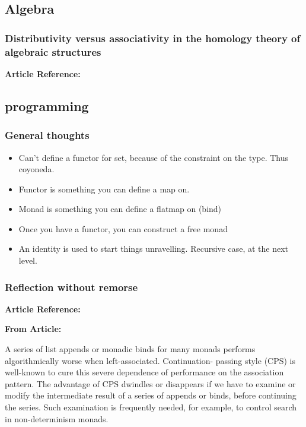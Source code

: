 \documentclass{article}
\begin{document}
\subsection{Algebra}

\subsubsection{Distributivity versus associativity in the homology theory of algebraic structures}

\textbf{Article Reference:} \cite{2011arXiv1109.4850P}

\subsection{programming}

\subsubsection{General thoughts}

\begin{itemize}
  \item Can't define a functor for set, because of the constraint on the type. Thus coyoneda. 
  \item Functor is something you can define a map on. 
  \item Monad is something you can define a flatmap on (bind)
  \item Once you have a functor, you can construct a free monad
  \item An identity is used to start things unravelling. Recursive case, at the next level. 
\end{itemize}

\subsubsection{Reflection without remorse}

\textbf{Article Reference:} \cite{conf/haskell/PloegKiselyov14}

\textbf{From Article:}

A series of list appends or monadic binds for many monads performs algorithmically worse when left-associated. Continuation- passing style (CPS) is well-known to cure this severe dependence of performance on the association pattern. The advantage of CPS dwindles or disappears if we have to examine or modify the intermediate result of a series of appends or binds, before continuing the series. Such examination is frequently needed, for example, to control search in non-determinism monads.
\end{document}
